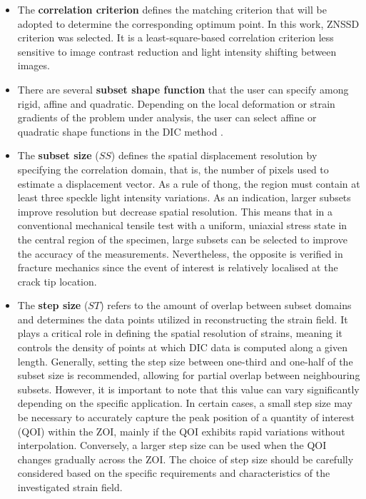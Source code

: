 \begin{itemize}
	\item The \textbf{correlation criterion} defines the matching criterion that will be adopted to determine the corresponding optimum point. In this work, ZNSSD criterion was selected. It is a least-square-based correlation criterion less sensitive to image contrast reduction and light intensity shifting between images.
	\item There are several \textbf{subset shape function} that the user can specify among rigid, affine and quadratic. Depending on the local deformation or strain gradients of the problem under analysis, the user can select affine or quadratic shape functions in the DIC method \citep{PereiraandXavier2018}.
	\item The \textbf{subset size} ($SS$) defines the spatial displacement resolution by specifying the correlation domain, that is, the number of pixels used to estimate a displacement vector. As a rule of thong, the region must contain at least three speckle light intensity variations. As an indication, larger subsets improve resolution but decrease spatial resolution. This means that in a conventional mechanical tensile test with a uniform, uniaxial stress state in the central region of the specimen, large subsets can be selected to improve the accuracy of the measurements. Nevertheless, the opposite is verified in fracture mechanics since the event of interest is relatively localised at the crack tip location.
	\item The \textbf{step size} ($ST$) refers to the amount of overlap between subset domains and determines the data points utilized in reconstructing the strain field. It plays a critical role in defining the spatial resolution of strains, meaning it controls the density of points at which DIC data is computed along a given length. Generally, setting the step size between one-third and one-half of the subset size is recommended, allowing for partial overlap between neighbouring subsets. However, it is important to note that this value can vary significantly depending on the specific application. In certain cases, a small step size may be necessary to accurately capture the peak position of a quantity of interest (QOI) within the ZOI, mainly if the QOI exhibits rapid variations without interpolation. Conversely, a larger step size can be used when the QOI changes gradually across the ZOI. The choice of step size should be carefully considered based on the specific requirements and characteristics of the investigated strain field.

\end{itemize}
